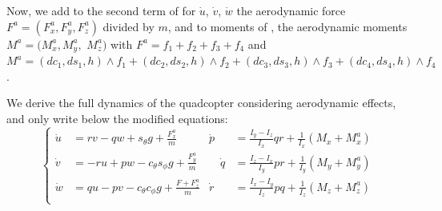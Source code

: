 \documentclass[anonymous=true,format=sigconf, screen=true, review=false]{acmart}
\begin{document}
Now, we add to the second term of  for $\dot{u}$, $\dot{v}$, $\dot{w}$ the aerodynamic force $F^a=(F^a_x,F^a_y,F^a_z)$ divided by $m$, and to moments of , the aerodynamic moments $M^a=(M^a_x, M^a_y,$ $M^a_z)$ with 
$F^a  = f_1+f_2+f_3+f_4$
and $M^a = (dc_1,ds_1,h)\wedge f_1 + (dc_2,ds_2,h) \wedge f_2
      + (dc_3,ds_3,h)\wedge f_3+(dc_4,ds_4,h) \wedge f_4$.

We derive the full dynamics of the quadcopter considering aerodynamic effects, and only write below the modified equations: 
\begin{equation}
\label{eq:aerodynamic}
\left\{
\begin{alignedat}{2}
\dot{u} &= rv - qw + s_\theta g + \tfrac{F^a_x}{m} & \dot{p} &= \tfrac{I_y - I_z}{I_x} qr + \tfrac{1}{I_x} (M_x+M^a_x) \\
\dot{v} &= -ru + pw - c_\theta s_\phi g\!+\!\tfrac{F^a_y}{m} &\quad \dot{q} &= \tfrac{I_z - I_x}{I_y} pr + \tfrac{1}{I_y} (M_y+M^a_y) \\
\dot{w} &= qu - pv - c_\theta c_\phi g\!+\!\tfrac{F+F^a_z}{m} &  \dot{r} &= \tfrac{I_x - I_y}{I_z} pq + \tfrac{1}{I_z} (M_z+M^a_z) \\
\end{alignedat}
\right.
\end{equation} 
\end{document}
